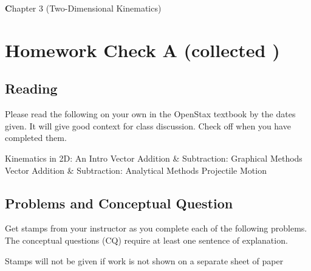 \documentclass[10pt]{exam}
\author{Rohrbach}
\date{\today}
\def\mytitle{Chapter 3 (Two-Dimensional Kinematics)}
\def\mymaketitle{
  \begin{flushleft}
    {\LARGE \textbf \mytitle \par}
  \end{flushleft}
}
\begin{document}
\mymaketitle



\newcommand{\stampbox}[1]{

  \hfill
  \begin{tikzpicture}[every text node part/.style={align=center}]
     \node[gray!50,draw,rounded corners] at (0,0) 
      {\sc Stamp \\ \sc Here \\ \small #1 \sc Points};
  \end{tikzpicture}
  \vspace{1em}
  
  \hrule

}

\section*{Homework Check A (collected \fillin[][6em])}



\subsection*{Reading}

Please read the following on your own in the OpenStax textbook by the dates given.  It will give good context for class discussion.  Check off when you have completed them.

\vspace{1em}

\begin{checkboxes}
   Kinematics in 2D: An Intro \dotfill \fillin[][6em]
   Vector Addition \& Subtraction: Graphical Methods \dotfill \fillin[][6em]
   Vector Addition \& Subtraction: Analytical Methods \dotfill \fillin[][6em]
   Projectile Motion \dotfill \fillin[][6em]
\end{checkboxes}


\subsection*{Problems and Conceptual Question}


Get stamps from your instructor as you complete each of the following problems.  The conceptual questions (CQ) require at least one sentence of explanation.

\vspace{1em}

\noindent
{\sc Stamps will not be given if work is not shown on a separate sheet of paper}
\end{document}
